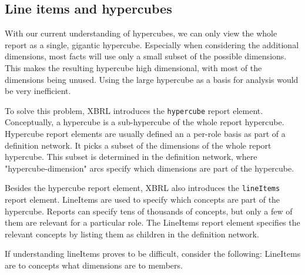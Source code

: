 \subsection{Line items and hypercubes}

With our current understanding of hypercubes, we can only view the whole report as a single, gigantic hypercube.
Especially when considering the additional dimensions, most facts will use only a small subset of the possible dimensions.
This makes the resulting hypercube high dimensional, with most of the dimensions being unused.
Using the large hypercube as a basis for analysis would be very inefficient.

To solve this problem, XBRL introduces the \texttt{hypercube} report element.
Conceptually, a hypercube is a sub-hypercube of the whole report hypercube.
Hypercube report elements are usually defined an a per-role basis as part of a definition network.
It picks a subset of the dimensions of the whole report hypercube.
This subset is determined in the definition network, where "hypercube-dimension" arcs specify which dimensions are part of the hypercube.

Besides the hypercube report element, XBRL also introduces the \texttt{lineItems} report element.
LineItems are used to specify which concepts are part of the hypercube.
Reports can specify tens of thousands of concepts, but only a few of them are relevant for a particular role.
The LineItems report element specifies the relevant concepts by listing them as children in the definition network.

If understanding lineItems proves to be difficult, consider the following: 
LineItems are to concepts what dimensions are to members.

